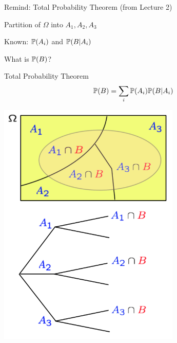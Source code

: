 \begin{frame}{Remind: Total Probability Theorem (from Lecture 2)}

{
\plitemsep 0.1in
\bci 

\item Partition of $\Omega$ into $A_1,A_2,A_3$

\item Known: $\mathbb{P}( A_i )$ and $\mathbb{P}( B | A_i )$ 

\item What is $\mathbb{P}( B )$? 

\bigskip
\medskip

\begin{block}{Total Probability Theorem}
$$
\mathbb{P}( B ) = \sum_{i} \mathbb{P}( A_i ) \mathbb{P}( B | A_i )
$$
\end{block}

\eci 
}
{
\centering
\includegraphics[width=0.65\textwidth]{L2_total_ex.png}
}

\end{frame}

